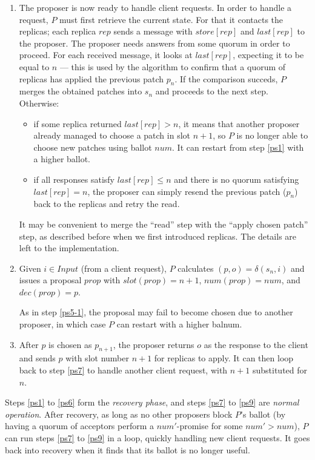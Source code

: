 \documentclass[12pt,a4paper,en]{pracamgr}
\newcommand{\ti}[1]{\textit{#1}}
\begin{document}
\begin{enumerate}
    \item \label{ps7} The proposer is now ready to handle client requests. In order to handle a request, $P$ must first retrieve the current state. For that it contacts the replicas; each replica $rep$ sends a message with $store[rep]$ and $last[rep]$ to the proposer. The proposer needs answers from some quorum in order to proceed. For each received message, it looks at $last[rep]$, expecting it to be equal to $n$ --- this is used by the algorithm to confirm that a quorum of replicas has applied the previous patch $p_n$. If the comparison succeds, $P$ merges the obtained patches into $s_n$ and proceeds to the next step. Otherwise:
        \begin{itemize}
            \item if some replica returned $last[rep] > n$, it means that another proposer already managed to choose a patch in slot $n+1$, so $P$ is no longer able to choose new patches using ballot $num$. It can restart from step \ref{ps1} with a higher ballot.
            \item if all responses satisfy $last[rep] \le n$ and there is no quorum satisfying $last[rep] = n$, the proposer can simply resend the previous patch ($p_n$) back to the replicas and retry the read.
        \end{itemize}

        It may be convenient to merge the ``read'' step with the ``apply chosen patch'' step, as described before when we first introduced replicas. The details are left to the implementation.
    \item \label{ps8} Given $i \in Input$ (from a client request), $P$ calculates $(p, o) = \delta(s_n, i)$ and issues a proposal $prop$ with $slot(prop) = n + 1$, $num(prop) = num$, and $dec(prop) = p$.

        As in step \ref{ps5-1}, the proposal may fail to become chosen due to another proposer, in which case $P$ can restart with a higher balnum.
    \item \label{ps9} After $p$ is chosen as $p_{n+1}$, the proposer returns $o$ as the response to the client and sends $p$ with slot number $n+1$ for replicas to apply. It can then loop back to step \ref{ps7} to handle another client request, with $n+1$ substituted for $n$.
\end{enumerate}

Steps \ref{ps1} to \ref{ps6} form the \ti{recovery phase}, and steps \ref{ps7} to \ref{ps9} are \ti{normal operation}. After recovery, as long as no other proposers block $P$'s ballot (by having a quorum of acceptors perform a $num'$-promise for some $num' > num$), $P$ can run steps \ref{ps7} to \ref{ps9} in a loop, quickly handling new client requests. It goes back into recovery when it finds that its ballot is no longer useful.
\end{document}

